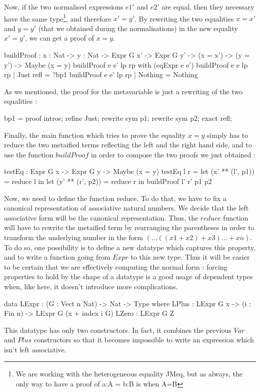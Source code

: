 \documentclass{sigplanconf}
\begin{document}
Now, if the two normalised expressions $e1'$ and $e2'$ are equal, then they necessary have the same type\footnote{We are working with the heterogeneous equality JMeq, but as always, the only way to have a proof of a:A = b:B is when A=B}, and therefore $x'=y'$.
By rewriting the two equalities $x=x'$ and $y=y'$ (that we obtained during the normalisations) in the new equality $x'=y'$, we can get a proof of $x=y$.

\begin{code}[caption=Building the desired proof with the two proofs of equality, captionpos=b, label=lst1:haskell2]
buildProof : {x : Nat} -> {y : Nat} 
       -> Expr G x' -> Expr G y' 
       -> (x = x') -> (y = y') 
       -> Maybe (x = y)
buildProof e e' lp rp with (eqExpr e e')
  buildProof e e lp rp | Just refl = ?bp1
  buildProof e e' lp rp | Nothing = Nothing
\end{code}

As we mentioned, the proof for the metavariable is just a rewriting of the two equalities :

\begin{code}[caption=buildProof metavariable, captionpos=b, label=lst1:haskell2]
  bp1 = proof {
  intros;
  refine Just;
  rewrite sym p1;
  rewrite sym p2;
  exact refl;
}  
\end{code}
Finally, the main function which tries to prove the equality $x=y$ simply has to reduce the two metaified terms reflecting the left and the right hand side, and to use the function $buildProof$ in order to compose the two proofs we just obtained :
\begin{code}[caption=testEq, captionpos=b, label=lst1:haskell2]
  testEq : Expr G x -> Expr G y 
           -> Maybe (x = y)
  testEq l r = 
     let (x' ** (l', p1)) = reduce l in 
     let (y' ** (r', p2)) = reduce r in
        buildProof l' r' p1 p2
\end{code}
Now, we need to define the function reduce. To do that, we have to fix a canonical representation of associative natural numbers. We decide that the left associative form will be the canonical representation. Thus, the $reduce$ function will have to rewrite the metaified term by rearranging the parentheses in order to transform the underlying number in the form $(...((x1 + x2) + x3) ... + xn)$. To do so, one possibility is to define a new datatype which captures this property, and to write a function going from $Expr$ to this new type. Thus it will be easier to be certain that we are effectively computing the normal form : forcing properties to hold by the shape of a datatype is a good usage of dependent types when, like here, it doesn't introduce more complications.
\begin{code}[caption=Reflected left associative numbers, captionpos=b, label=lst1:haskell2]
data LExpr : (G : Vect n Nat) -> Nat 
             -> Type where
     LPlus : LExpr G x -> (i : Fin n) 
             -> LExpr G (x + index i G)
     LZero : LExpr G Z
\end{code}
This datatype has only two constructors. In fact, it combines the previous $Var$ and $Plus$ constructors so that it becomes impossible to write an expression which isn't left associative.
 
\end{document}
